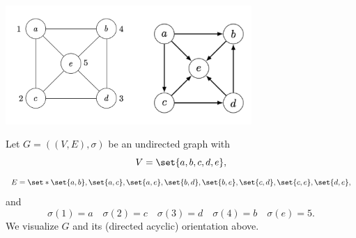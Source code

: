 \begin{center}\includegraphics[width=0.70\textwidth]{./graphics/figuresidebyside.png}\end{center}


Let $G = ((V, E), \sigma )$ be an undirected graph with
\[
V = \set{a,b,c,d,e},
\]
\[
E = \set*{\set{a, b}, \set{a, c}, \set{a, e}, \set{b, d}, \set{b, e}, \set{c, d}, \set{c, e}, \set{d,e}},
\]
and
\[
\sigma (1) = a \quad \sigma (2) = c \quad \sigma (3) = d \quad \sigma (4) = b \quad \sigma (e) = 5.
\]
We visualize $G$ and its (directed acyclic) orientation above.
